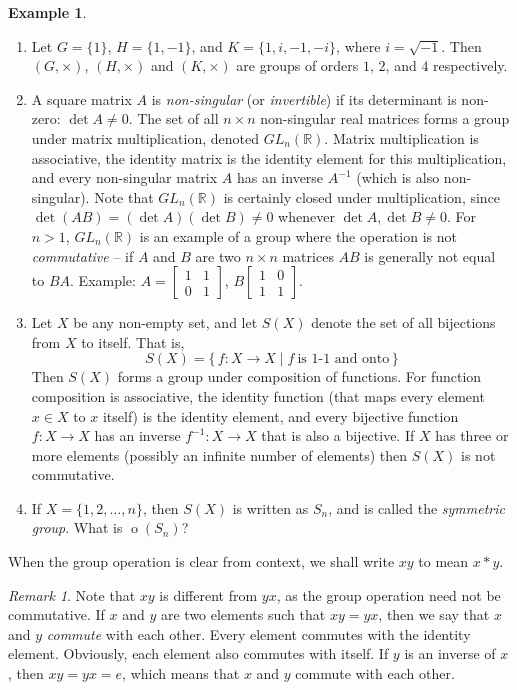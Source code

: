 \documentclass[svgnames]{article}
\theoremstyle{definition}
\newtheorem{Example}[Theorem]{Example}
\theoremstyle{remark}
\newtheorem*{Remark*}{Remark}
\DeclareMathOperator{\ord}{o}
\begin{document}
\begin{Example}
\begin{enumerate}
\item Let $G = \{1\}$, $H = \{1, -1\}$, and $K = \{1, i, -1, -i\}$, where $i = \sqrt{-1}$. Then $(G, \times)$, $(H, \times)$ and $(K, \times)$ are groups of orders $1$, $2$, and $4$ respectively.
\item A square matrix $A$ is \emph{non-singular} (or \emph{invertible}) if its determinant is non-zero: $\det A \ne 0$. The set of all $n \times n$ non-singular real matrices forms a group under matrix multiplication, denoted $GL_n(\mathbb R)$. Matrix multiplication is associative, the identity matrix is the identity element for this multiplication, and every non-singular matrix $A$ has an inverse $A^{-1}$ (which is also non-singular). Note that $GL_n(\mathbb R)$ is certainly closed under multiplication, since $\det(AB) = (\det A)(\det B) \ne 0$ whenever $\det A, \det B \ne 0$. For $n > 1$, $GL_n(\mathbb R)$ is an example of a group where the operation is not \emph{commutative} -- if $A$ and $B$ are two $n \times n$ matrices $AB$ is generally not equal to $BA$. Example: $A = \begin{bmatrix} 1 & 1\\ 0 & 1\end{bmatrix}$, $B\begin{bmatrix}1 & 0\\ 1 & 1\end{bmatrix}$.
\item Let $X$ be any non-empty set, and let $S(X)$ denote the set of all bijections from $X$ to itself. That is,
\begin{equation*}
S(X) = \{\, f\colon X \to X \mid f\ \text{is $1$-$1$ and onto} \,\}
\end{equation*}
Then $S(X)$ forms a group under composition of functions. For function composition is associative, the identity function (that maps every element $x \in X$ to $x$ itself) is the identity element, and every bijective function $f \colon X \to X$ has an inverse $f^{-1} \colon X \to X$ that is also a bijective. If $X$ has three or more elements (possibly an infinite number of elements) then $S(X)$ is not commutative.
\item\label{it:Sn} If $X = \{1, 2, \ldots, n\}$, then $S(X)$ is written as $S_n$, and is called the \emph{symmetric group}. What is $\ord(S_n)$?
\end{enumerate}
\end{Example}
When the group operation is clear from context, we shall write $xy$ to mean $x * y$.

\begin{Remark*}
Note that $xy$ is different from $yx$, as the group operation need not be commutative. If $x$ and $y$ are two elements such that $xy = yx$, then we say that $x$ and $y$ \emph{commute} with each other. Every element commutes with the identity element. Obviously, each element also commutes with itself. If $y$ is an inverse of $x$, then $xy = yx = e$, which means that $x$ and $y$ commute with each other.
\end{Remark*}
\end{document}
